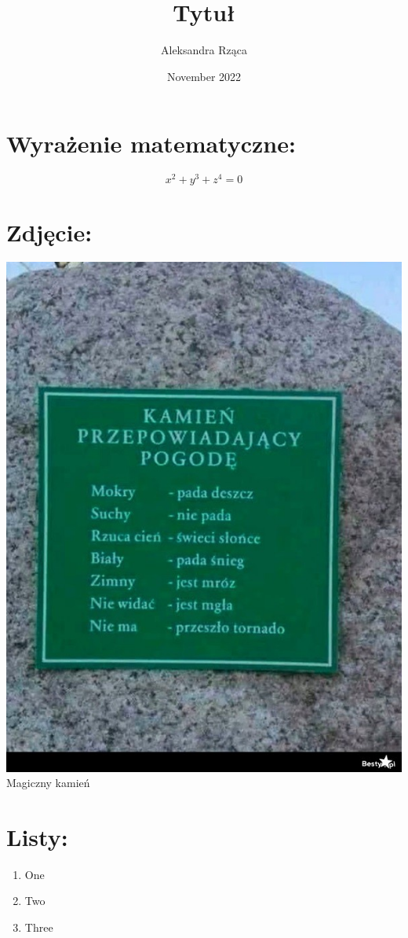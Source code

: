 \documentclass[12pt]{article}
\title{Tytuł}
\author{Aleksandra Rząca}
\date{November 2022}
\begin{document}
\maketitle

\section{Wyrażenie matematyczne:}
    \large\[x^2+y^3+z^4=0\]

\section{Zdjęcie:}
\begin{center}
    \includegraphics[scale=0.25]{Pictures/kamyk.jpg}
    \\
    \caption{Magiczny kamień}
    \label{fig:kamyk}
\end{center}

\section{Listy:}
\begin{enumerate}
    \item One
    \item Two
    \item Three
\end{enumerate}
\end{document}

